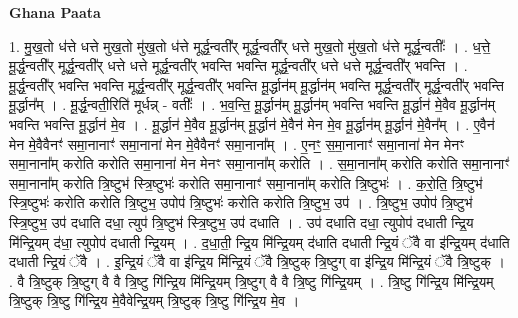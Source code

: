 \documentclass[17pt]{extarticle}
\begin{document}
\textbf{Ghana Paata } \newline

1. मु॒ख॒तो ध॑त्ते धत्ते मुख॒तो मु॑ख॒तो ध॑त्ते मूर्द्ध॒न्वती᳚र् मूर्द्ध॒न्वती᳚र् धत्ते मुख॒तो मु॑ख॒तो ध॑त्ते मूर्द्ध॒न्वतीः᳚ । . ध॒त्ते॒ मू॒र्द्ध॒न्वती᳚र् मूर्द्ध॒न्वती᳚र् धत्ते धत्ते मूर्द्ध॒न्वती᳚र् भवन्ति भवन्ति मूर्द्ध॒न्वती᳚र् धत्ते धत्ते मूर्द्ध॒न्वती᳚र् भवन्ति । . मू॒र्द्ध॒न्वती᳚र् भवन्ति भवन्ति मूर्द्ध॒न्वती᳚र् मूर्द्ध॒न्वती᳚र् भवन्ति मू॒र्द्धान॑म् मू॒र्द्धान॑म् भवन्ति मूर्द्ध॒न्वती᳚र् मूर्द्ध॒न्वती᳚र् भवन्ति मू॒र्द्धान᳚म् । . मू॒र्द्ध॒न्वती॒रिति॑ मूर्धन्न् - वतीः᳚ । . भ॒व॒न्ति॒ मू॒र्द्धान॑म् मू॒र्द्धान॑म् भवन्ति भवन्ति मू॒र्द्धान॑ मे॒वैव मू॒र्द्धान॑म् भवन्ति भवन्ति मू॒र्द्धान॑ मे॒व । . मू॒र्द्धान॑ मे॒वैव मू॒र्द्धान॑म् मू॒र्द्धान॑ मे॒वैन॑ मेन मे॒व मू॒र्द्धान॑म् मू॒र्द्धान॑ मे॒वैन᳚म् । . ए॒वैन॑ मेन मे॒वैवैनꣳ॑ समा॒नानाꣳ॑ समा॒नाना॑ मेन मे॒वैवैनꣳ॑ समा॒नाना᳚म् । . ए॒नꣳ॒॒ स॒मा॒नानाꣳ॑ समा॒नाना॑ मेन मेनꣳ समा॒नाना᳚म् करोति करोति समा॒नाना॑ मेन मेनꣳ समा॒नाना᳚म् करोति । . स॒मा॒नाना᳚म् करोति करोति समा॒नानाꣳ॑ समा॒नाना᳚म् करोति त्रि॒ष्टुभ॑ स्त्रि॒ष्टुभः॑ करोति समा॒नानाꣳ॑ समा॒नाना᳚म् करोति त्रि॒ष्टुभः॑ । . क॒रो॒ति॒ त्रि॒ष्टुभ॑ स्त्रि॒ष्टुभः॑ करोति करोति त्रि॒ष्टुभ॒ उपोप॑ त्रि॒ष्टुभः॑ करोति करोति त्रि॒ष्टुभ॒ उप॑ । . त्रि॒ष्टुभ॒ उपोप॑ त्रि॒ष्टुभ॑ स्त्रि॒ष्टुभ॒ उप॑ दधाति दधा॒ त्युप॑ त्रि॒ष्टुभ॑ स्त्रि॒ष्टुभ॒ उप॑ दधाति । . उप॑ दधाति दधा॒ त्युपोप॑ दधाती न्द्रि॒य मि॑न्द्रि॒यम् द॑धा॒ त्युपोप॑ दधाती न्द्रि॒यम् । . द॒धा॒ती॒ न्द्रि॒य मि॑न्द्रि॒यम् द॑धाति दधाती न्द्रि॒यं ॅवै वा इ॑न्द्रि॒यम् द॑धाति दधाती न्द्रि॒यं ॅवै । . इ॒न्द्रि॒यं ॅवै वा इ॑न्द्रि॒य मि॑न्द्रि॒यं ॅवै त्रि॒ष्टुक् त्रि॒ष्टुग् वा इ॑न्द्रि॒य मि॑न्द्रि॒यं ॅवै त्रि॒ष्टुक् । . वै त्रि॒ष्टुक् त्रि॒ष्टुग् वै वै त्रि॒ष्टु गि॑न्द्रि॒य मि॑न्द्रि॒यम् त्रि॒ष्टुग् वै वै त्रि॒ष्टु गि॑न्द्रि॒यम् । . त्रि॒ष्टु गि॑न्द्रि॒य मि॑न्द्रि॒यम् त्रि॒ष्टुक् त्रि॒ष्टु गि॑न्द्रि॒य मे॒वैवेन्द्रि॒यम् त्रि॒ष्टुक् त्रि॒ष्टु गि॑न्द्रि॒य मे॒व । \newline
\end{document}
